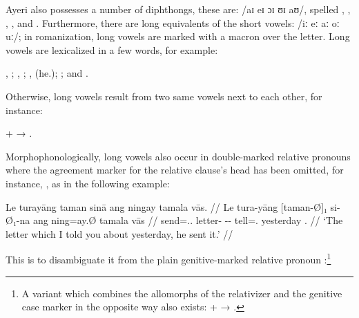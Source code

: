 Ayeri also possesses a number of diphthongs, these are: 
/aɪ eɪ ɔɪ ʊɪ aʊ/, spelled , , , , and 
. Furthermore, there are long equivalents of the short vowels: /iː eː 
aː oː uː/; in romanization, long vowels are marked with a macron 
 over the letter. Long vowels are lexicalized in a few words, for 
example:

\pex
	\a {}, ;
	\a {}, ;
	\a {},  
		(he.\Aarg{});\label{ex:laa}
	\a {}; and 
	\a {}.\footnotemark
\xe


\noindent Otherwise, long vowels result from two same vowels next to each other, 
for instance:

\ex
	 +  → 
	.\label{ex:longvwls}
\xe

\label{doublerel}
Morphophonologically, long vowels also occur in double-marked relative 
pronouns where the agreement 
marker for the relative clause's head has been omitted, for instance, 
, as in the following 
example:

\ex\begingl
	\gla Le turayāng taman sinā ang ningay tamala vās. //
	\glb Le tura-yāng [taman-Ø]₁ si-Ø₁-na ang ning=ay.Ø 
		tamala vās //
	\glc \PatTI{} send=\Tsg{}.\M{}.\Aarg{} letter-\Top{} 
		\Rel{}-\PatTI{}-\Gen{} \AgtT{} tell=\Fsg{}.\Top{} yesterday 
		\Ssg{}.\Parg{} //
	\glft `The letter which I told you about yesterday, he sent it.' //
\endgl\xe

\noindent This is to disambiguate it from the plain genitive-marked relative 
pronoun :\footnote{A variant which combines the 
allomorphs of the relativizer and the genitive case marker in the opposite way 
also exists:  +  → .}

